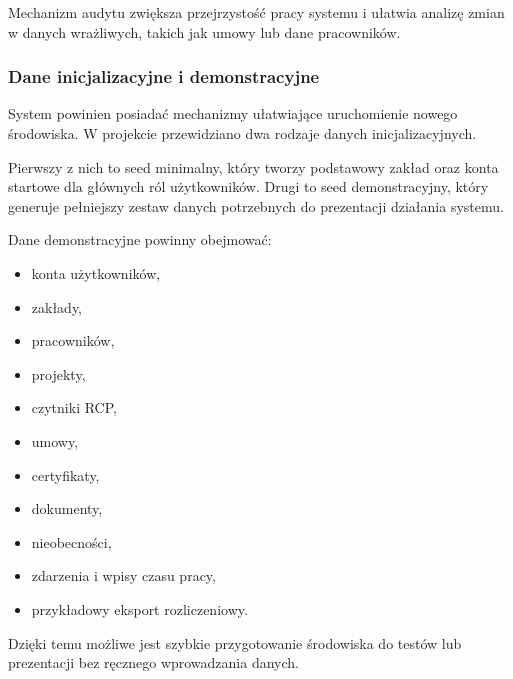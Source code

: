 Mechanizm audytu zwiększa przejrzystość pracy systemu i ułatwia analizę zmian w danych wrażliwych, takich jak umowy lub dane pracowników.

\subsubsection{Dane inicjalizacyjne i demonstracyjne}

System powinien posiadać mechanizmy ułatwiające uruchomienie nowego środowiska. W projekcie przewidziano dwa rodzaje danych inicjalizacyjnych.

Pierwszy z nich to seed minimalny, który tworzy podstawowy zakład oraz konta startowe dla głównych ról użytkowników. Drugi to seed demonstracyjny, który generuje pełniejszy zestaw danych potrzebnych do prezentacji działania systemu.

Dane demonstracyjne powinny obejmować:
\begin{itemize}
    \item konta użytkowników,
    \item zakłady,
    \item pracowników,
    \item projekty,
    \item czytniki RCP,
    \item umowy,
    \item certyfikaty,
    \item dokumenty,
    \item nieobecności,
    \item zdarzenia i wpisy czasu pracy,
    \item przykładowy eksport rozliczeniowy.
\end{itemize}

Dzięki temu możliwe jest szybkie przygotowanie środowiska do testów lub prezentacji bez ręcznego wprowadzania danych.